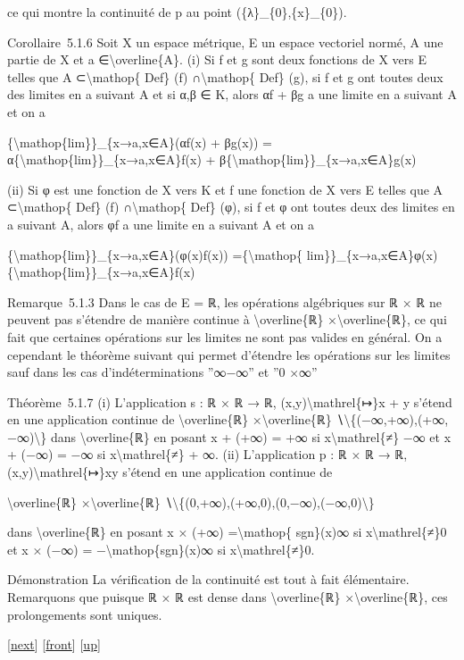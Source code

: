 \documentclass[]{article}
\begin{document}
ce qui montre la continuité de p au point (\{λ\}\_\{0\},\{x\}\_\{0\}).

Corollaire~5.1.6 Soit X un espace métrique, E un espace vectoriel normé,
A une partie de X et a ∈\textbackslash{}overline\{A\}. (i) Si f et g
sont deux fonctions de X vers E telles que A ⊂\textbackslash{}mathop\{
Def\} (f) ∩\textbackslash{}mathop\{ Def\} (g), si f et g ont toutes deux
des limites en a suivant A et si α,β ∈ K, alors αf + βg a une limite en
a suivant A et on a

\{\textbackslash{}mathop\{lim\}\}\_\{x→a,x∈A\}(αf(x) + βg(x)) =
α\{\textbackslash{}mathop\{lim\}\}\_\{x→a,x∈A\}f(x) +
β\{\textbackslash{}mathop\{lim\}\}\_\{x→a,x∈A\}g(x)

(ii) Si φ est une fonction de X vers K et f une fonction de X vers E
telles que A ⊂\textbackslash{}mathop\{ Def\} (f)
∩\textbackslash{}mathop\{ Def\} (φ), si f et φ ont toutes deux des
limites en a suivant A, alors φf a une limite en a suivant A et on a

\{\textbackslash{}mathop\{lim\}\}\_\{x→a,x∈A\}(φ(x)f(x))
=\{\textbackslash{}mathop\{
lim\}\}\_\{x→a,x∈A\}φ(x)\{\textbackslash{}mathop\{lim\}\}\_\{x→a,x∈A\}f(x)

Remarque~5.1.3 Dans le cas de E = ℝ, les opérations algébriques sur ℝ ×
ℝ ne peuvent pas s'étendre de manière continue à
\textbackslash{}overline\{ℝ\} ×\textbackslash{}overline\{ℝ\}, ce qui
fait que certaines opérations sur les limites ne sont pas valides en
général. On a cependant le théorème suivant qui permet d'étendre les
opérations sur les limites sauf dans les cas d'indéterminations ''∞−∞''
et ''0 ×∞''

Théorème~5.1.7 (i) L'application s : ℝ × ℝ → ℝ,
(x,y)\textbackslash{}mathrel\{↦\}x + y s'étend en une application
continue de \textbackslash{}overline\{ℝ\} ×\textbackslash{}overline\{ℝ\}
∖\textbackslash{}\{(−∞,+∞),(+∞,−∞)\textbackslash{}\} dans
\textbackslash{}overline\{ℝ\} en posant x + (+∞) = +∞ si
x\textbackslash{}mathrel\{≠\} −∞ et x + (−∞) = −∞ si
x\textbackslash{}mathrel\{≠\} + ∞. (ii) L'application p : ℝ × ℝ → ℝ,
(x,y)\textbackslash{}mathrel\{↦\}xy s'étend en une application continue
de

\textbackslash{}overline\{ℝ\} ×\textbackslash{}overline\{ℝ\}
∖\textbackslash{}\{(0,+∞),(+∞,0),(0,−∞),(−∞,0)\textbackslash{}\}

dans \textbackslash{}overline\{ℝ\} en posant x × (+∞)
=\textbackslash{}mathop\{ sgn\}(x)∞ si x\textbackslash{}mathrel\{≠\}0 et
x × (−∞) = −\textbackslash{}mathop\{sgn\}(x)∞ si
x\textbackslash{}mathrel\{≠\}0.

Démonstration La vérification de la continuité est tout à fait
élémentaire. Remarquons que puisque ℝ × ℝ est dense dans
\textbackslash{}overline\{ℝ\} ×\textbackslash{}overline\{ℝ\}, ces
prolongements sont uniques.

{[}\href{coursse28.html}{next}{]} {[}\href{coursse27.html}{front}{]}
{[}\href{coursch6.html\#coursse27.html}{up}{]}
\end{document}
